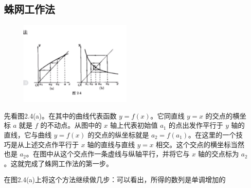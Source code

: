 \documentclass[lang=cn,10pt,thmcnt=section]{elegantbook}
\begin{document}
\subsection{蛛网工作法}
\begin{figure}[h]
	\centering
	\includegraphics[width=0.5\textwidth]{figure/1.PNG}
\end{figure}
先看图2.4(a)。在其中的曲线代表函数 \( y = f(x) \)。它同直线 \( y = x \) 的交点的横坐标 \( a \) 就是 \( f \) 的不动点。从图中的 \( x \) 轴上代表初始值 \( a_1 \) 的点出发作平行于 \( y \) 轴的直线，它与曲线 \( y = f(x) \) 的交点的纵坐标就是 \( a_2 = f(a_1) \)。在这里的一个技巧是从上述交点作平行于 \( x \) 轴的直线与直线 \( y = x \) 相交。这个交点的横坐标当然也是 \( a_2 \)。在图中从这个交点作一条虚线与纵轴平行，并将它与 \( x \) 轴的交点标为 \( a_2 \)。这就完成了蛛网工作法的第一步。

在图2.4(a)上将这个方法继续做几步：可以看出，所得的数列是单调增加的
\end{document}
